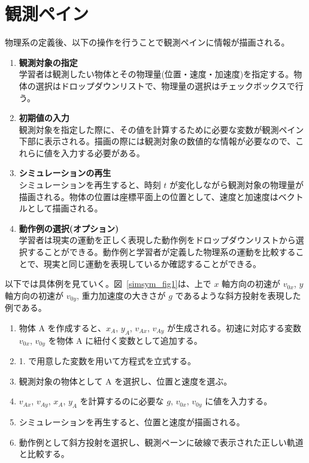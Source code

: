 \section{観測ペイン}

物理系の定義後、以下の操作を行うことで観測ペインに情報が描画される。

\begin{enumerate}[resume]
\item \textbf{観測対象の指定}\\
学習者は観測したい物体とその物理量(位置・速度・加速度)を指定する。物体の選択はドロップダウンリストで、物理量の選択はチェックボックスで行う。
\item \textbf{初期値の入力}\\
観測対象を指定した際に、その値を計算するために必要な変数が観測ペイン下部に表示される。描画の際には観測対象の数値的な情報が必要なので、これらに値を入力する必要がある。
\item \textbf{シミュレーションの再生}\\
シミュレーションを再生すると、時刻 $t$ が変化しながら観測対象の物理量が描画される。物体の位置は座標平面上の位置として、速度と加速度はベクトルとして描画される。
\item \textbf{動作例の選択(オプション)}\\
学習者は現実の運動を正しく表現した動作例をドロップダウンリストから選択することができる。動作例と学習者が定義した物理系の運動を比較することで、現実と同じ運動を表現しているか確認することができる。
\end{enumerate}

以下では具体例を見ていく。図~\ref{simsym_fig1}は、\simname 上で $x$ 軸方向の初速が $v_{0x}$, $y$ 軸方向の初速が $v_{0y}$, 重力加速度の大きさが $g$ であるような斜方投射を表現した例である。
\begin{enumerate}
\item 物体 A を作成すると、$x_A$, $y_A$, $v_{Ax}$, $v_{Ay}$ が生成される。初速に対応する変数 $v_{0x}$, $v_{0y}$ を物体 A に紐付く変数として追加する。
\item 1. で用意した変数を用いて方程式を立式する。
\item 観測対象の物体として A を選択し、位置と速度を選ぶ。
\item $v_{Ax}$, $v_{Ay}$, $x_A$, $y_A$ を計算するのに必要な $g$, $v_{0x}$, $v_{0y}$ に値を入力する。
\item シミュレーションを再生すると、位置と速度が描画される。
\item 動作例として斜方投射を選択し、観測ペーンに破線で表示された正しい軌道と比較する。
\end{enumerate}

